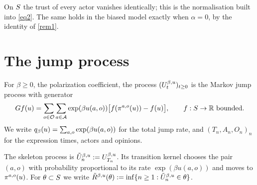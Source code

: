 \begin{remark}
  \label{rem3}
  \leanok
  On $S$ the trust of every actor vanishes identically; this is the
  normalisation built into \ref{eq2}.  The same holds in the biased model
  exactly when $\alpha = 0$, by the identity of \ref{rem1}.
\end{remark}

\section{The jump process}

\begin{definition}
  \label{eq3}
  \leanok
  For $\beta \ge 0$, the polarization coefficient, the process
  $(U^{\beta,u}_t)_{t \ge 0}$ is the Markov jump process with generator
  \[
    G f(u) = \sum_{o \in \mathcal{O}} \sum_{a \in \mathcal{A}}
      \exp(\beta u(a,o)) \bigl[ f(\pi^{a,o}(u)) - f(u) \bigr],
    \qquad f : S \to \mathbb{R} \text{ bounded}.
  \]
  We write $q_\beta(u) = \sum_{a,o} \exp(\beta u(a,o))$ for the total jump
  rate, and $(T_n, A_n, O_n)_n$ for the expression times, actors and opinions.
\end{definition}

\begin{definition}
  \label{def3}
  \leanok
  The skeleton process is $\tilde{U}^{\beta,u}_n := U^{\beta,u}_{T_n}$.  Its transition
  kernel chooses the pair $(a,o)$ with probability proportional to its rate
  $\exp(\beta u(a,o))$ and moves to $\pi^{a,o}(u)$.  For
  $\theta \subset S$ we write
  $\tilde{R}^{\beta,u}(\theta) := \inf\{ n \ge 1 : \tilde{U}^{\beta,u}_n \in \theta \}$.
\end{definition}

